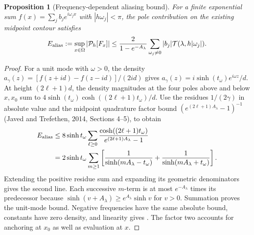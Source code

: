 \documentclass[11pt]{article}
\newtheorem{proposition}{Proposition}
\begin{document}
\begin{proposition}[Frequency-dependent aliasing bound]
\label{prop:bandwidth-alias}
For a finite exponential sum $f(x)=\sum_j b_je^{i\omega_jx}$ with
$|h\omega_j|<\pi$, the pole contribution on the existing midpoint contour
satisfies
\begin{equation}
 E_{\rm alias}:=\sup_{x\in\Omega}|\mathcal P_h[F_x]|
 \le\frac{2}{1-e^{-A_\lambda}}
       \sum_{\omega_j\ne0}|b_j|\mathcal T(\lambda,h|\omega_j|).
 \label{eq:bandwidth-weighted-bound}
\end{equation}
\end{proposition}
\begin{proof}
For a unit mode with $\omega>0$, the density $a_\gamma(z)=[f(z+id)-f(z-id)]/(2id)$ gives
$a_\gamma(z)=i\sinh(t_\omega)e^{i\omega z}/d$. At height
$(2\ell+1)d$, the density magnitudes at the four poles above and below
$x,x_0$ sum to $4\sinh(t_\omega)\cosh((2\ell+1)t_\omega)/d$.
Use the residues $1/(2\gamma)$ in absolute value and
the midpoint quadrature factor bound $(e^{(2\ell+1)A_\lambda}-1)^{-1}$
(Javed and Trefethen, 2014, Sections 4--5), to obtain
\begin{align*}
 E_{\rm alias}
 &\le8\sinh t_\omega\sum_{\ell\ge0}
       \frac{\cosh((2\ell+1)t_\omega)}{e^{(2\ell+1)A_\lambda}-1}\\
 &=2\sinh t_\omega\sum_{m\ge1}
       \left[\frac1{\sinh(mA_\lambda-t_\omega)}
             +\frac1{\sinh(mA_\lambda+t_\omega)}\right].
\end{align*}
Extending the positive residue sum and expanding its geometric denominators
gives the second line. Each successive $m$-term is at most
$e^{-A_\lambda}$ times its predecessor because
$\sinh(v+A_\lambda)\ge e^{A_\lambda}\sinh v$ for $v>0$.
Summation proves the unit-mode bound. Negative frequencies have the same
absolute bound, constants have zero density, and linearity gives
. The factor two accounts for anchoring
at $x_0$ as well as evaluation at $x$.
\end{proof}
\end{document}
